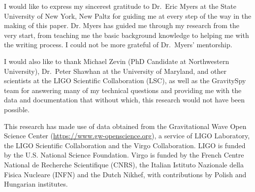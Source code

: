 \documentclass[preprint,
letterpaper,
 amsmath,amssymb,
 aps,
]{revtex4-2}
\begin{document}
\begin{acknowledgments}
I would like to express my sincerest gratitude to Dr.\ Eric Myers at the State University of New York, New Paltz for guiding me at every step of the way in the making of this paper. Dr. Myers has guided me through my research from the very start, from teaching me the basic background knowledge to helping me with the writing process. I could not be more grateful of Dr.\ Myers' mentorship.

I would also like to thank Michael Zevin (PhD Candidate at Northwestern University), Dr.\ Peter Shawhan at the University of Maryland, and other scientists at the LIGO Scientific Collaboration (LSC), as well as the GravitySpy team for answering many of my technical questions and providing me with the data and documentation that without which, this research would not have been possible. 

This research has made use of data obtained from the Gravitational Wave Open Science Center (\url{https://www.gw-openscience.org}), a service of LIGO Laboratory, the LIGO Scientific Collaboration and the Virgo Collaboration. LIGO is funded by the U.S. National Science Foundation. Virgo is funded by the French Centre National de Recherche Scientifique (CNRS), the Italian Istituto Nazionale della Fisica Nucleare (INFN) and the Dutch Nikhef, with contributions by Polish and Hungarian institutes.
\end{acknowledgments}



\end{document}
